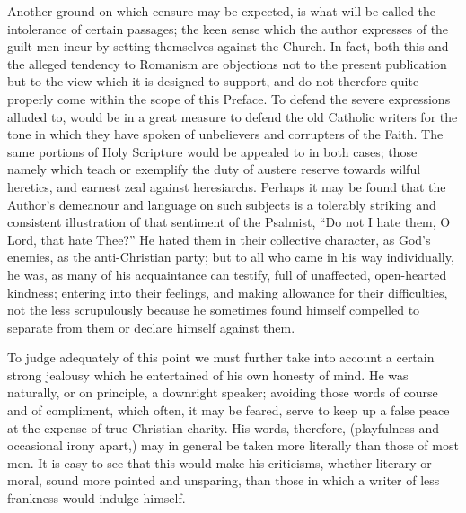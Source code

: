 Another ground on which
censure may be expected, is what will be called the intolerance of
certain passages; the keen sense which the author expresses of the
guilt men incur by setting themselves against the Church. In fact,
both this and the alleged tendency to Romanism are objections not to
the present publication but to the view which it is designed to
support, and do not therefore quite properly come within the scope of
this Preface. To defend the severe expressions alluded to, would be in
a great measure to defend the old Catholic writers for the
tone in which they have spoken of unbelievers and corrupters of the
Faith. The same portions of Holy Scripture would be appealed to in
both cases; those namely which teach or exemplify the duty of austere
reserve towards wilful heretics, and earnest zeal against heresiarchs.
Perhaps it may be found that the Author's demeanour and language on
such subjects is a tolerably striking and consistent illustration of
that sentiment of the Psalmist, ``Do not I hate them, O Lord, that hate
Thee?'' He hated them in their collective character, as God's enemies,
as the anti-Christian party; but to all who came in his way
individually, he was, as many of his acquaintance can testify, full of
unaffected, open-hearted kindness; entering into their feelings, and
making allowance for their difficulties, not the less scrupulously
because he sometimes found himself compelled to separate from them or
declare himself against them.

To judge adequately of this
point we must further take into account a certain strong jealousy
which he entertained of his own honesty of mind. He was naturally, or
on principle, a downright speaker; avoiding those words of course and
of compliment, which often, it may be feared, serve to keep up a
false peace at the expense of true Christian charity. His words,
therefore, (playfulness and occasional irony apart,) may in general be
taken more literally than those of most men. It is easy to see that
this would make his criticisms, whether literary or moral, sound more
pointed and unsparing, than those in which a writer of less frankness
would indulge himself.

